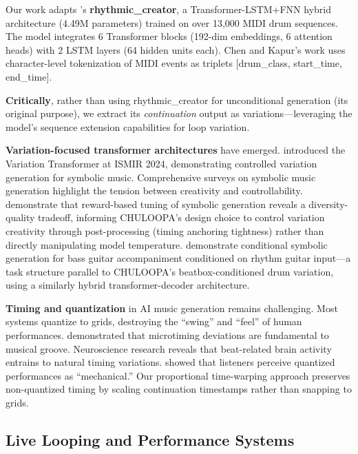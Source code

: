\documentclass{aimc2026}
\begin{document}
Our work adapts \citet{chen2025music}'s \textbf{rhythmic\_creator}, a Transformer-LSTM+FNN hybrid architecture (4.49M parameters) trained on over 13,000 MIDI drum sequences. The model integrates 6 Transformer blocks (192-dim embeddings, 6 attention heads) with 2 LSTM layers (64 hidden units each). Chen and Kapur's work uses character-level tokenization of MIDI events as triplets [drum\_class, start\_time, end\_time].

\textbf{Critically}, rather than using rhythmic\_creator for unconditional generation (its original purpose), we extract its \emph{continuation} output as variations---leveraging the model's sequence extension capabilities for loop variation.

\textbf{Variation-focused transformer architectures} have emerged. \citet{jiang2024variation} introduced the Variation Transformer at ISMIR 2024, demonstrating controlled variation generation for symbolic music. Comprehensive surveys on symbolic music generation \citep{briot2020deep,ji2023comprehensive} highlight the tension between creativity and controllability. \citet{jonason2025smart} demonstrate that reward-based tuning of symbolic generation reveals a diversity-quality tradeoff, informing CHULOOPA's design choice to control variation creativity through post-processing (timing anchoring tightness) rather than directly manipulating model temperature. \citet{anoufa2025bass} demonstrate conditional symbolic generation for bass guitar accompaniment conditioned on rhythm guitar input---a task structure parallel to CHULOOPA's beatbox-conditioned drum variation, using a similarly hybrid transformer-decoder architecture.

\textbf{Timing and quantization} in AI music generation remains challenging. Most systems quantize to grids, destroying the ``swing'' and ``feel'' of human performances. \citet{davies2013microtiming} demonstrated that microtiming deviations are fundamental to musical groove. Neuroscience research \citep{harding2024science} reveals that beat-related brain activity entrains to natural timing variations. \citet{kilchenmann2015microtiming} showed that listeners perceive quantized performances as ``mechanical.'' Our proportional time-warping approach preserves non-quantized timing by scaling continuation timestamps rather than snapping to grids.

\subsection{Live Looping and Performance Systems}
\end{document}
